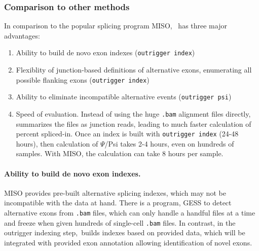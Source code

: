 

\subsubsection{Comparison to other methods}

In comparison to the popular splicing program MISO\cite{Katz:2010iv}, \outrigger\, has three major advantages:

\begin{enumerate}
	\item Ability to build de novo exon indexes (\texttt{outrigger index})
	\item Flexiblity of junction-based definitions of alternative exons, enumerating all possible flanking exons (\texttt{outrigger index})
	\item Ability to eliminate incompatible alternative events (\texttt{outrigger psi})
	\item Speed of evaluation. Instead of using the huge \texttt{.bam} alignment files directly, \outrigger\, summarizes the files as junction reads, leading to much faster calculation of percent spliced-in. Once an index is built with \texttt{outrigger index} (24-48 hours), then calculation of $\Psi$/Psi takes 2-4 hours, even on hundreds of samples. With MISO, the calculation can take 8 hours per sample.
\end{enumerate}


\paragraph{Ability to build de novo exon indexes.} MISO provides pre-built alternative splicing indexes, which may not be incompatible with the data at hand. There is a program, GESS\cite{Ye:2014cd} to detect alternative exons from \texttt{.bam} files, which can only handle a handful files at a time and freeze when given hundreds of single-cell \texttt{.bam} files. In contrast, in the outrigger indexing step, \outrigger\,builds indexes based on provided data, which will be integrated with provided exon annotation allowing identification of novel exons.

